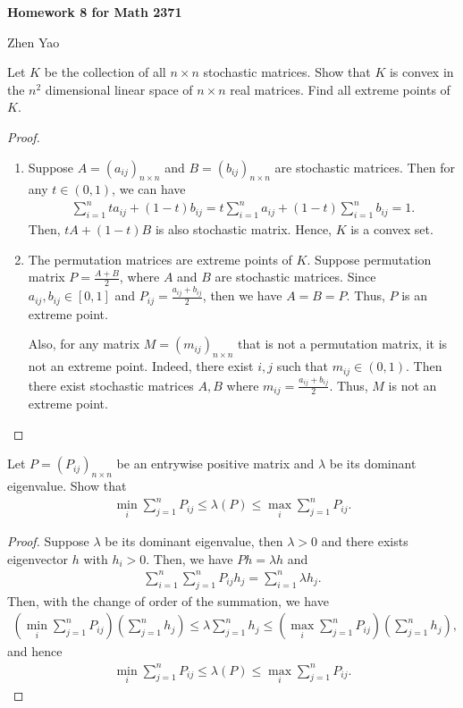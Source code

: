 \documentclass[12pt]{article}
\begin{document}
\centerline{\bf Homework 8 for Math 2371}
\centerline{Zhen Yao}

\medskip

Let $K$ be the collection of all $n\times n$ stochastic matrices. Show that $K$ is convex in the $n^2$ dimensional linear space of $n\times n$ real matrices. Find all extreme points of $K$.
\begin{proof}
~\begin{enumerate}[label=(\arabic*)]
    \item Suppose $A = \left(a_{ij}\right)_{n\times n}$ and $B = \left(b_{ij}\right)_{n\times n}$ are stochastic matrices. Then for any $t\in (0,1)$, we can have 
    \begin{align*}
        \sum^n_{i=1} t a_{ij} + (1-t)b_{ij} = t \sum^n_{i=1} a_{ij} + (1-t) \sum^n_{i=1} b_{ij} = 1.
    \end{align*}
    Then, $tA + (1-t) B$ is also stochastic matrix. Hence, $K$ is a convex set.
    
    \item The permutation matrices are extreme points of $K$. Suppose permutation matrix $P = \frac{A + B}{2}$, where $A$ and $B$ are stochastic matrices. Since $a_{ij}, b_{ij} \in [0,1]$ and $P_{ij} = \frac{a_{ij} + b_{ij}}{2}$, then we have $A = B = P$. Thus, $P$ is an extreme point. 
    
    Also, for any matrix $M = \left(m_{ij}\right)_{n\times n}$ that is not a permutation matrix, it is not an extreme point. Indeed, there exist $i, j$ such that $m_{ij} \in (0,1)$. Then there exist stochastic matrices $A, B$ where $m_{ij} = \frac{a_{ij} + b_{ij}}{2}$. Thus, $M$ is not an extreme point.
\end{enumerate}
\end{proof}

\medskip

Let $P = \left(P_{ij}\right)_{n\times n}$ be an entrywise positive matrix and $\lambda$ be its dominant eigenvalue. Show that 
\begin{align*}
    \min_{i} \sum^n_{j=1} P_{ij} \leq \lambda(P) \leq \max_{i} \sum^n_{j=1} P_{ij}.
\end{align*}
\begin{proof}
Suppose $\lambda$ be its dominant eigenvalue, then $\lambda > 0$ and there exists eigenvector $h$ with $h_i > 0$. Then, we have $Ph = \lambda h$ and 
\begin{align*}
    \sum^n_{i=1}\sum^n_{j=1} P_{ij} h_j = \sum^n_{i=1} \lambda h_j.
\end{align*}
Then, with the change of order of the summation, we have 
\begin{align*}
    \left(\min_{i} \sum^n_{j=1} P_{ij} \right) \left(\sum^n_{j=1}h_j\right) \leq \lambda \sum^n_{j=1}h_j \leq \left(\max_{i} \sum^n_{j=1} P_{ij} \right) \left(\sum^n_{j=1}h_j\right),
\end{align*}
and hence
\begin{align*}
    \min_{i} \sum^n_{j=1} P_{ij} \leq \lambda(P) \leq \max_{i} \sum^n_{j=1} P_{ij}.
\end{align*}
\end{proof}
\end{document}
